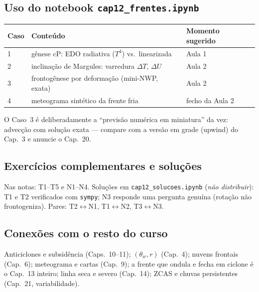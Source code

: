 \subsection*{Uso do notebook \texttt{cap12\_frentes.ipynb}}

\begin{center}
\begin{tabular}{lll}
\hline
Caso & Conteúdo & Momento sugerido \\
\hline
1 & gênese cP: EDO radiativa ($T^4$) vs.\ linearizada & Aula 1 \\
2 & inclinação de Margules: varredura $\Delta T$, $\Delta U$ & Aula 2 \\
3 & frontogênese por deformação (mini-NWP, exata) & Aula 2 \\
4 & meteograma sintético da frente fria & fecho da Aula 2 \\
\hline
\end{tabular}
\end{center}

O Caso~3 é deliberadamente a ``previsão numérica em miniatura'' da vez:
advecção com solução exata — compare com a versão em grade (upwind) do
Cap.~3 e anuncie o Cap.~20.

\subsection*{Exercícios complementares e soluções}

Nas notas: T1--T5 e N1--N4. Soluções em \texttt{cap12\_solucoes.ipynb}
(\emph{não distribuir}): T1 e T2 verificados com \texttt{sympy}; N3
responde uma pergunta genuína (rotação não frontogeniza). Pares:
T2$\leftrightarrow$N1, T1$\leftrightarrow$N2, T3$\leftrightarrow$N3.

\subsection*{Conexões com o resto do curso}

Anticiclones e subsidência (Caps.~10--11); $(\theta_w, r)$ (Cap.~4);
nuvens frontais (Cap.~6); meteograma e cartas (Cap.~9); a frente que
ondula e fecha em ciclone é o Cap.~13 inteiro; linha seca e severo
(Cap.~14); ZCAS e chuvas persistentes (Cap.~21, variabilidade).
